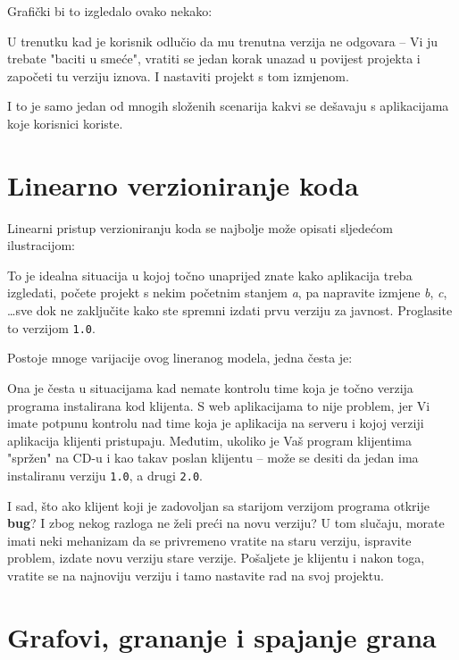 Grafički bi to izgledalo ovako nekako:



U trenutku kad je korisnik odlučio da mu trenutna verzija ne odgovara -- Vi ju trebate "baciti u smeće", vratiti se jedan korak unazad u povijest projekta i započeti tu verziju iznova. I nastaviti projekt s tom izmjenom.

I to je samo jedan od mnogih složenih scenarija kakvi se dešavaju s aplikacijama koje korisnici koriste.

\section*{Linearno verzioniranje koda}

Linearni pristup verzioniranju koda se najbolje može opisati sljedećom ilustracijom:



To je idealna situacija u kojoj točno unaprijed znate kako aplikacija treba izgledati, počete projekt s nekim početnim stanjem \emph{a}, pa napravite izmjene \emph{b}, \emph{c}, \dots sve dok ne zaključite kako ste spremni izdati prvu verziju za javnost.
Proglasite to verzijom \texttt{1.0}. 

Postoje mnoge varijacije ovog lineranog modela, jedna česta je:



Ona je česta u situacijama kad nemate kontrolu time koja je točno verzija programa instalirana kod klijenta. 
S web aplikacijama to nije problem, jer Vi imate potpunu kontrolu nad time koja je aplikacija na serveru i kojoj verziji aplikacija klijenti pristupaju.
Međutim, ukoliko je Vaš program klijentima "spržen" na CD-u i kao takav poslan klijentu -- može se desiti da jedan ima instaliranu verziju \texttt{1.0}, a drugi \texttt{2.0}.

I sad, što ako klijent koji je zadovoljan sa starijom verzijom programa otkrije \textbf{bug}?
I zbog nekog razloga ne želi preći na novu verziju?
U tom slučaju, morate imati neki mehanizam da se privremeno vratite na staru verziju, ispravite problem, izdate novu verziju stare verzije. 
Pošaljete je klijentu i nakon toga, vratite se na najnoviju verziju i tamo nastavite rad na svoj projektu.

\section*{Grafovi, grananje i spajanje grana}

